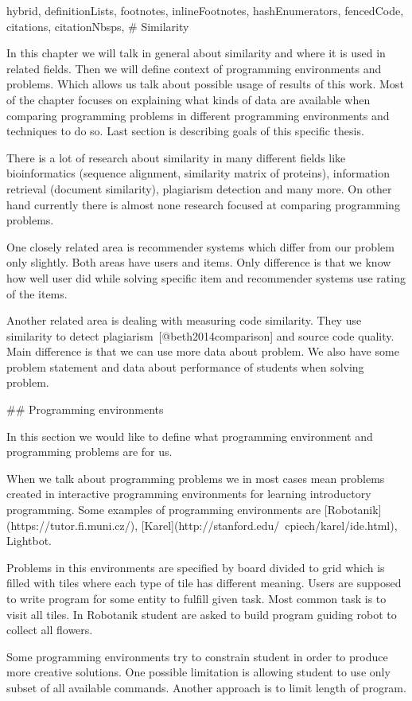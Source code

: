 \documentclass[
  digital, %
  table,   %
  lof,     %
  lot,     %
]{fithesis3}
\begin{document}
\begin{markdown*}{%
  hybrid,
  definitionLists,
  footnotes,
  inlineFootnotes,
  hashEnumerators,
  fencedCode,
  citations,
  citationNbsps,
}
# Similarity

In this chapter we will talk in general about similarity and where it is used in related fields. Then we will define context of programming environments and problems. Which allows us talk about possible usage of results of this work. Most of the chapter focuses on explaining what kinds of data are available when comparing programming problems in different programming environments and techniques to do so. Last section is describing goals of this specific thesis.

There is a lot of research about similarity in many different fields like bioinformatics (sequence alignment, similarity matrix of proteins), information retrieval (document similarity), plagiarism detection and many more. On other hand currently there is almost none research focused at comparing programming problems.

One closely related area is recommender systems which differ from our problem only slightly. Both areas have users and items. Only difference is that we know how well user did while solving specific item and recommender systems use rating of the items.

Another related area is dealing with measuring code similarity. They use similarity to detect plagiarism~[@beth2014comparison] and source code quality. Main difference is that we can use more data about problem. We also have some problem statement and data about performance of students when solving problem.

## Programming environments

In this section we would like to define what programming environment and programming problems are for us.

When we talk about programming problems we in most cases mean problems created in interactive programming environments for learning introductory programming. Some examples of programming environments are [Robotanik](https://tutor.fi.muni.cz/), [Karel](http://stanford.edu/~cpiech/karel/ide.html), Lightbot.

Problems in this environments are specified by board divided to grid which is filled with tiles where each type of tile has different meaning. Users are supposed to write program for some entity to fulfill given task. Most common task is to visit all  tiles. In Robotanik student are asked to build program guiding robot to collect all flowers.

Some programming environments try to constrain student in order to produce more creative solutions. One possible limitation is allowing student to use only subset of all available commands. Another approach is to limit length of program.


\end{markdown*}
\end{document}
